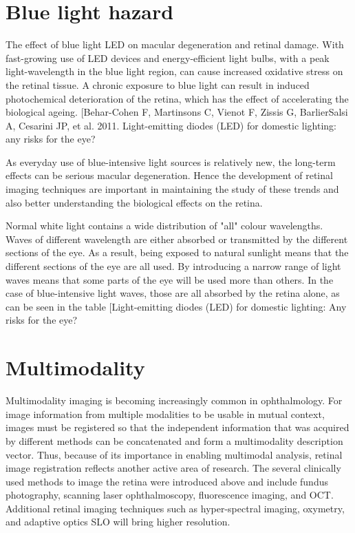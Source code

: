 \section{Blue light hazard}

The effect of blue light LED on macular degeneration and retinal
damage. With fast-growing use of LED devices and energy-efficient
light bulbs, with a peak light-wavelength in the blue light region,
can cause increased oxidative stress on the retinal tissue.\cite{}
A chronic exposure to blue light can result in induced photochemical
deterioration of the retina, which has the effect of accelerating the
biological ageing. [Behar-Cohen F, Martinsons C, Vienot F, Zissis G,
BarlierSalsi A, Cesarini JP, et al. 2011. Light-emitting diodes (LED)
for domestic lighting: any risks for the eye?\cite{}

As everyday use of blue-intensive light sources is relatively new,
the long-term effects can be serious macular degeneration. Hence the
development of retinal imaging techniques are important in maintaining
the study of these trends and also better understanding the biological
effects on the retina.
 
Normal white light contains a wide distribution of "all" colour
wavelengths. Waves of different wavelength are either absorbed or
transmitted by the different sections of the eye. As a result,
being exposed to natural sunlight means that the different sections
of the eye are all used. By introducing a narrow range of light waves
means that some parts of the eye will be used more than others. In the
case of blue-intensive light waves, those are all absorbed by the retina
alone, as can be seen in the table [Light-emitting diodes (LED) for
domestic lighting: Any risks for the eye?\cite{}

\section{Multimodality}

Multimodality imaging is becoming increasingly common in
ophthalmology. For image information from multiple modalities
to be usable in mutual context, images must be registered so
that the independent information that was acquired by different
methods can be concatenated and form a multimodality description
vector. Thus, because of its importance in enabling multimodal
analysis, retinal image registration reflects another active
area of research. The several clinically used methods to image
the retina were introduced above and include fundus photography,
scanning laser ophthalmoscopy, fluorescence imaging, and OCT.
Additional retinal imaging techniques such as hyper-spectral imaging,
oxymetry, and adaptive optics SLO will bring higher resolution.

